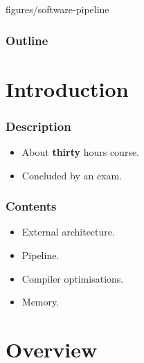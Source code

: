 		{figures/software-pipeline}

%
%



%
%

\begin{frame}
  \titlepage

  \begin{center}
    \logos
  \end{center}
\end{frame}

%
%

\begin{frame}
  \frametitle{Outline}
  \tableofcontents
\end{frame}

%
%

\section{Introduction}


\begin{frame}
  \frametitle{Description}

  \begin{itemize}[<+->]
    \item
      About \textbf{thirty} hours course.
    \item
      Concluded by an exam.
  \end{itemize}
\end{frame}


\begin{frame}
  \frametitle{Contents}

  \begin{itemize}[<+->]
    \item
      External architecture.
    \item
      Pipeline.
    \item
      Compiler optimisations.
    \item
      Memory.
  \end{itemize}
\end{frame}

%
%

\section{Overview}


